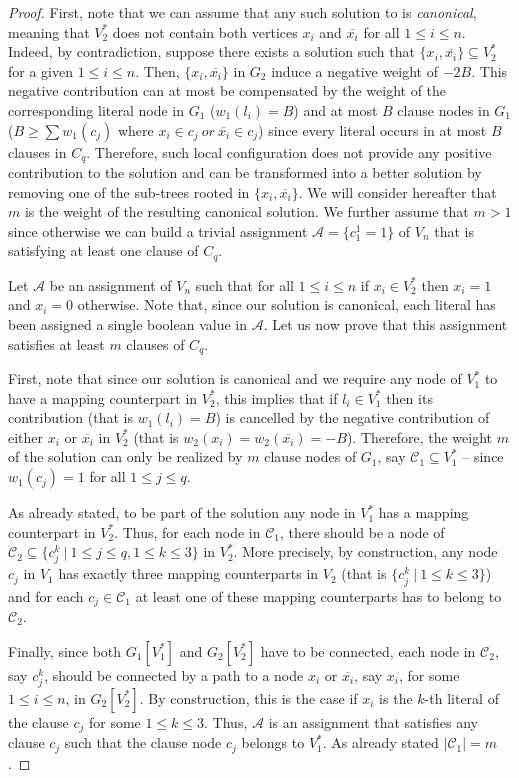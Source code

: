 \begin{proof}
 	 	 First, note that we can assume that any such solution to \mwccs{} is \textit{canonical}, meaning that $V_2^*$ does not contain both vertices $x_i$ and $\overline{x_i}$ for all $1\leq i\leq n$. Indeed, by contradiction, suppose there exists a solution such that $\{x_i,\overline{x_i}\}\subseteq V_2^*$ for a given $1\leq i \leq n$. Then, $\{x_i,\overline{x_i}\}$ in $G_2$ induce a negative weight of $-2B$. This negative contribution can at most be compensated by the weight of the corresponding literal node in $G_1$ ($w_1(l_i)=B$) and at most $B$ clause nodes in $G_1$ ($B \geq \sum w_1(c_j)$ where $x_i\in c_j\ or\ \overline{x_i}\in c_j$) since every literal occurs in at most $B$ clauses in $C_q$. Therefore, such local configuration does not provide any positive contribution to the solution and can be transformed into a better solution by removing one of the sub-trees rooted in $\{x_i,\overline{x_i}\}$. We will consider hereafter that $m$ is the weight of the resulting canonical solution. We further assume that $m>1$ since otherwise we can build a trivial assignment $\mathcal{A}=\{c^1_1=1\}$ of $V_n$ that is satisfying at least one clause of $C_q$.

		Let $\mathcal{A}$ be an assignment of $V_n$ such that for all $1\leq i\leq n$ if $x_i\in V_2^*$ then $x_i=1$ and $x_i=0$ otherwise. Note that, since our solution is canonical, each literal has been assigned a single boolean value in $\mathcal{A}$. Let us now prove that this assignment satisfies at least $m$ clauses of $C_q$.

		First, note that since our solution is canonical and we require any node of $V_1^*$ to have a mapping counterpart in $V_2^*$, this implies that if $l_i\in V_1^*$ then its contribution (that is $w_1(l_i)=B$) is cancelled by the negative contribution of either $x_i$ or $\overline{x_i}$ in $V_2^*$ (that is $w_2(x_i)=w_2(\overline{x_i})=-B$). Therefore, the weight $m$ of the solution can only be realized by $m$ clause nodes of $G_1$, say $\mathcal{C}_1\subseteq V_1^*$ -- since $w_1(c_j)=1$ for all $1\leq j \leq q$.

		As already stated, to be part of the solution any node in $V_1^*$ has a mapping counterpart in $V_2^*$. Thus, for each node in $\mathcal{C}_1$, there should be a node of $\mathcal{C}_2 \subseteq \{c_j^k ~\vert~ 1\leq j \leq q, 1\leq k\leq 3\}$ in $V_2^*$. More precisely, by construction, any node $c_j$ in $V_1$ has exactly three mapping counterparts in $V_2$ (that is $\{c_j^k ~\vert~ 1\leq k \leq 3\}$) and for each $c_j\in \mathcal{C}_1$ at least one of these mapping counterparts has to belong to $\mathcal{C}_2$.

		Finally, since both $G_1[V_1^*]$ and $G_2[V_2^*]$ have to be connected, each node in $\mathcal{C}_2$, say $c_j^k$, should be connected by a path to a node $x_i$ or $\overline{x_i}$, say $x_i$, for some $1\leq i \leq n$, in $G_2[V_2^*]$. By construction, this is the case if $x_i$ is the $k$-th literal of the clause $c_j$ for some $1\leq k \leq 3$. Thus, $\mathcal{A}$ is an assignment that satisfies any clause $c_j$ such that the clause node $c_j$ belongs to $V_1^*$. As already stated $|\mathcal{C}_1|=m$.
		\end{proof}

